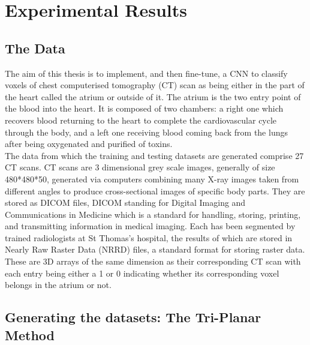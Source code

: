 \chapter{Experimental Results}

\section{The Data}

\noindent The aim of this thesis is to implement, and then fine-tune, a CNN to classify voxels of chest computerised tomography (CT) scan as being either in the part of the heart called the atrium or outside of it. The atrium is the two entry point of the blood into the heart. It is composed of two chambers: a right one which recovers blood returning to the heart to complete the cardiovascular cycle through the body, and a left one receiving blood coming back from the lungs after being oxygenated and purified of toxins.\\

\noindent The data from which the training and testing datasets are generated comprise 27 CT scans. CT scans are 3 dimensional grey scale images, generally of size 480*480*50, generated via computers combining many X-ray images taken from different angles to produce cross-sectional images of specific body parts. They are stored as DICOM files, DICOM standing for Digital Imaging and Communications in Medicine which is a standard for handling, storing, printing, and transmitting information in medical imaging. Each has been segmented by trained radiologists at St Thomas's hospital, the results of which are stored in Nearly Raw Raster Data (NRRD) files, a standard format for storing raster data. These are 3D arrays of the same dimension as their corresponding CT scan with each entry being either a 1 or 0 indicating whether its corresponding voxel belongs in the atrium or not. 

\section{Generating the datasets: The Tri-Planar Method}

